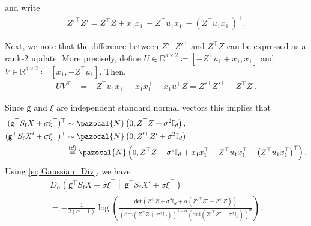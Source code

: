\documentclass[11pt]{article}
\theoremstyle{definition}
\theoremstyle{plain}
\newcommand{\reals}{\mathbb{R}}
\providecommand{\brI}{\mathbb{I}}
\newcommand{\deter}[1]{\mathrm{det}\left(#1 \right)}
\providecommand{\KLDA}[2]{{D_{\alpha} \left( #1 \middle\| #2 \right)}}
\newcommand{\pN}{\pazocal{N}}
\begin{document}
and write
\begin{align}
    Z'^{\top}Z'
    = Z^{\top}Z + x_1x^{\top}_1 - Z^{\top}u_1x^{\top}_1 - \left(Z^{\top}u_1x^{\top}_1\right)^{\top}.
\end{align}

Next, we note that the difference between \(Z'^{\top}Z'^{\top}\) and \(Z^{\top}Z\) can be expressed as a rank-2 update.
More precisely, define \(U \in \reals^{d \times 2}\coloneq [-Z^{\top}u_{1} + x_{1}, x_{1}]\) and \(V \in \reals^{d \times 2}\coloneq [x_{1}, -Z^{\top}u_{1}]\).
Then,
\begin{align*}
    UV^{\top} &= -Z^{\top}u_{1}x_{1}^{\top} + x_{1}x_{1}^{\top} - x_{1}u_{1}^{\top}Z = Z'^{\top}Z'^{\top} - Z^{\top}Z~.
\end{align*}


Since $\mathsf{g}$ and $\xi$ are independent standard normal vectors this implies that 
\begin{align}
    (\mathsf{g}^{\top}S_{\mathrm{f}}X + \sigma \xi^{\top})^{\top} &\sim \pN\left(0, Z^{\top}Z + \sigma^2 \brI_d\right), \\
    (\mathsf{g}^{\top}S_{\mathrm{f}}X' + \sigma \xi^{\top})^{\top} &\sim \pN\left(0, Z'^{\top}Z' + \sigma^2 \brI_d\right) \\
    &\overset{(d)}= \pN\left(0, Z^{\top}Z + \sigma^2 \brI_d +  x_1x^{\top}_1 - Z^{\top}u_1x^{\top}_1 - \left(Z^{\top}u_1x^{\top}_1\right)^{\top}\right).
\end{align}
Using \eqref{eq:Gaussian_Div}, we have  
\begin{multline}
    \label{eq:divergence_simplified_Gaussian}
    \KLDA{\mathsf{g}^{\top}S_{\mathrm{f}}X+ \sigma \xi^{\top}}{\mathsf{g}^{\top}S_{\mathrm{f}}X'+ \sigma \xi^{\top}} \\
    =- \frac{1}{2(\alpha - 1)} \log \left(\frac{\deter{Z^{\top}Z+\sigma^2 \brI_d + \alpha(Z'^{\top}Z' - Z^{\top}Z)}}{\left(\deter{Z^{\top}Z +\sigma^2 \brI_d}\right)^{1-\alpha}\left(\deter{Z'^{\top}Z' + \sigma^2 \brI_d}\right)^{\alpha}}\right).
\end{multline}
\end{document}
